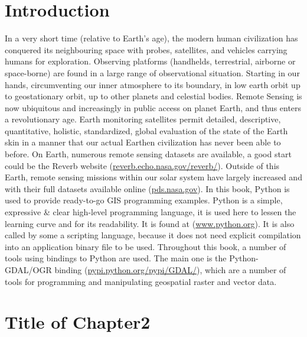 \documentclass[10pt]{book}
\begin{document}
\chapter{Introduction}
In a very short time (relative to Earth's age), the modern human civilization has conquered its neighbouring space with
probes, satellites, and vehicles carrying humans for exploration. Observing platforms (handhelds, 
terrestrial, airborne or space-borne) are found in a large range of observational situation. 
Starting in our hands, circumventing our inner atmosphere to its boundary, in low earth orbit up to geostationary orbit,
up to other planets and celestial bodies.\newline\linebreak
Remote Sensing is now ubiquitous and increasingly in public access on planet Earth, and thus enters a revolutionary age.
Earth monitoring satellites permit detailed, descriptive, quantitative, holistic, standardized, global evaluation
of the state of the Earth skin in a manner that our actual Earthen civilization has never been able to before.\newline\linebreak
On Earth, numerous remote sensing datasets are available, a good start could be the Reverb website 
(\href{http://reverb.echo.nasa.gov/reverb/}{reverb.echo.nasa.gov/reverb/}). Outside of this Earth, remote sensing missions 
within our solar system have largely increased and with their full datasets available online 
(\href{http://pds.nasa.gov}{pds.nasa.gov}).\newline\linebreak
In this book, Python is used to provide ready-to-go GIS programming examples. Python is a simple, expressive \& clear 
high-level programming language, it is used here to lessen the learning curve and for its readability. It is found at
(\href{http://www.python.org}{www.python.org}). It is also called by some a scripting language,
because it does not need explicit compilation into an application binary file to be used. Throughout this book, a number of
tools using bindings to Python are used. The main one is the Python-GDAL/OGR binding 
(\href{http://pypi.python.org/pypi/GDAL/}{pypi.python.org/pypi/GDAL/}), which are a number of tools for programming
and manipulating geospatial raster and vector data.\newline
\newpage


\chapter{Title of Chapter2}
\end{document}
